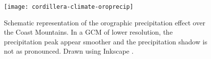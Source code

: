 \begin{figure}[t]
	\vspace*{2mm}
	\begin{center}
		\texttt{[image: cordillera-climate-oroprecip]}
	\end{center}
	\caption{Schematic representation of the orographic precipitation effect over the Coast Mountains. In a GCM of lower resolution, the precipitation peak appear smoother and the precipitation shadow is not as pronounced. Drawn using Inkscape \citep{web:inkscape}.}
	\label{fig:oroprecip}
\end{figure}
